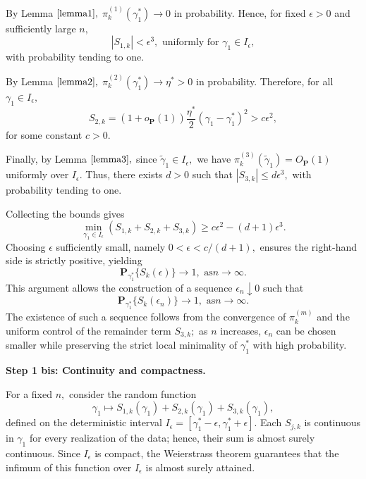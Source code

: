 \documentclass[reqno,openbib,runningheads,a4paper,12pt]{amsart}%
\begin{document}
\noindent By Lemma $\ref{lemma1},$ $\pi_{k}^{(1)}(\gamma_{1}^{\ast
})\rightarrow0$ in probability. Hence, for fixed $\epsilon>0$ and sufficiently
large $n,$
\[
|S_{1,k}|<\epsilon^{3},\text{ uniformly for }\gamma_{1}\in I_{\epsilon},
\]
with probability tending to one.\smallskip

\noindent By Lemma $\ref{lemma2},$ $\pi_{k}^{(2)}(\gamma_{1}^{\ast
})\rightarrow\eta^{\ast}>0$ in probability. Therefore, for all $\gamma_{1}\in
I_{\epsilon},$
\[
S_{2,k}=\left(  1+o_{\mathbf{P}}(1)\right)  \frac{\eta^{\ast}}{2}\left(
\gamma_{1}-\gamma_{1}^{\ast}\right)  ^{2}>c\epsilon^{2},
\]
for some constant $c>0.$\smallskip

\noindent Finally, by Lemma $\ref{lemma3},$ since $\widetilde{\gamma}_{1}\in
I_{\epsilon},$ we have $\pi_{k}^{(3)}(\widetilde{\gamma}_{1})=O_{\mathbf{P}%
}(1)$ uniformly over $I_{\epsilon}.$ Thus, there exists $d>0$ such that
$\left\vert S_{3,k}\right\vert \leq d\epsilon^{3},$ with probability tending
to one.\smallskip

\noindent Collecting the bounds gives
\[
\min_{\gamma_{1}\in I_{\epsilon}}\left(  S_{1,k}+S_{2,k}+S_{3,k}\right)  \geq
c\epsilon^{2}-\left(  d+1\right)  \epsilon^{3}.
\]
Choosing $\epsilon$ sufficiently small, namely $0<\epsilon<c/(d+1),$ ensures
the right-hand side is strictly positive, yielding
\[
\mathbf{P}_{\gamma_{1}^{\ast}}\{S_{k}(\epsilon)\}\rightarrow1,\text{ as
}n\rightarrow\infty.
\]
This argument allows the construction of a sequence $\epsilon_{n}\downarrow0$
such that
\[
\mathbf{P}_{\gamma_{1}^{\ast}}\{S_{k}(\epsilon_{n})\}\rightarrow1,\text{ as
}n\rightarrow\infty.
\]
The existence of such a sequence follows from the convergence of $\pi
_{k}^{(m)}$ and the uniform control of the remainder term $S_{3,k};$ as $n$
increases, $\epsilon_{n}$ can be chosen smaller while preserving the strict
local minimality of $\gamma_{1}^{\ast}$ with high probability.\smallskip

\noindent\textbf{Step 1 bis: Continuity and compactness.}\smallskip

\noindent For a fixed $n,$ consider the random function
\[
\gamma_{1}\mapsto S_{1,k}(\gamma_{1})+S_{2,k}(\gamma_{1})+S_{3,k}(\gamma
_{1}),
\]
defined on the deterministic interval $I_{\epsilon}=[\gamma_{1}^{\ast
}-\epsilon,\gamma_{1}^{\ast}+\epsilon].$ Each $S_{j,k}$ is continuous in
$\gamma_{1}$ for every realization of the data; hence, their sum is almost
surely continuous. Since $I_{\epsilon}$ is compact, the Weierstrass theorem
guarantees that the infimum of this function over $I_{\epsilon}$ is almost
surely attained.\smallskip
\end{document}
